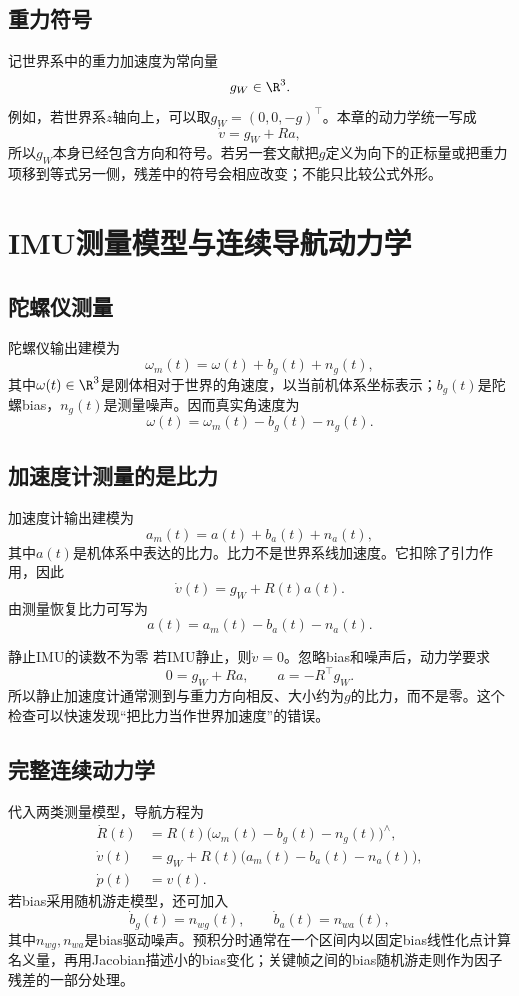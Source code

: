 \subsection{重力符号}

记世界系中的重力加速度为常向量
\[
    g_W\in\R^3.
\]
例如，若世界系$z$轴向上，可以取$g_W=(0,0,-g)^\top$。本章的动力学统一写成
\[
    \dot v=g_W+Ra,
\]
所以$g_W$本身已经包含方向和符号。若另一套文献把$g$定义为向下的正标量或把重力项移到等式另一侧，残差中的符号会相应改变；不能只比较公式外形。


\section{IMU测量模型与连续导航动力学}

\subsection{陀螺仪测量}

陀螺仪输出建模为
\[
    \omega_m(t)
    =\omega(t)+b_g(t)+n_g(t),
\]
其中$\omega(t)\in\R^3$是刚体相对于世界的角速度，以当前机体系坐标表示；$b_g(t)$是陀螺bias，$n_g(t)$是测量噪声。因而真实角速度为
\[
    \omega(t)=\omega_m(t)-b_g(t)-n_g(t).
\]

\subsection{加速度计测量的是比力}

加速度计输出建模为
\[
    a_m(t)=a(t)+b_a(t)+n_a(t),
\]
其中$a(t)$是机体系中表达的比力。比力不是世界系线加速度。它扣除了引力作用，因此
\[
    \dot v(t)=g_W+R(t)a(t).
\]
由测量恢复比力可写为
\[
    a(t)=a_m(t)-b_a(t)-n_a(t).
\]

\begin{imucase}{静止IMU的读数不为零}
若IMU静止，则$\dot v=0$。忽略bias和噪声后，动力学要求
\[
    0=g_W+Ra,
    \qquad
    a=-R^\top g_W.
\]
所以静止加速度计通常测到与重力方向相反、大小约为$g$的比力，而不是零。这个检查可以快速发现“把比力当作世界加速度”的错误。
\end{imucase}

\subsection{完整连续动力学}

代入两类测量模型，导航方程为
\[
\boxed{
\begin{aligned}
    \dot R(t)
    &=R(t)\bigl(\omega_m(t)-b_g(t)-n_g(t)\bigr)^\wedge,\\
    \dot v(t)
    &=g_W+R(t)\bigl(a_m(t)-b_a(t)-n_a(t)\bigr),\\
    \dot p(t)
    &=v(t).
\end{aligned}
}
\]
若bias采用随机游走模型，还可加入
\[
    \dot b_g(t)=n_{wg}(t),
    \qquad
    \dot b_a(t)=n_{wa}(t),
\]
其中$n_{wg},n_{wa}$是bias驱动噪声。预积分时通常在一个区间内以固定bias线性化点计算名义量，再用Jacobian描述小的bias变化；关键帧之间的bias随机游走则作为因子残差的一部分处理。

